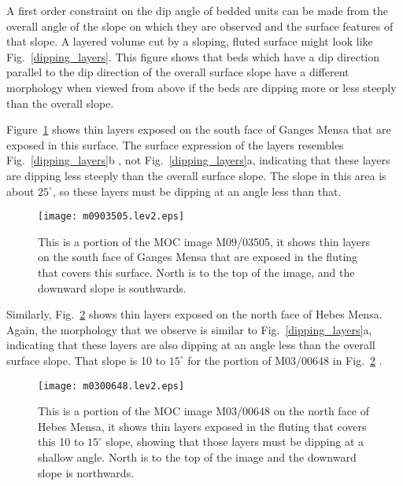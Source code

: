 \documentclass{lpscabs}
\begin{document}
\begin{abstracttext}
A first order constraint on the dip angle of bedded units can be
made from the overall angle of the slope on which they are observed
and the surface features of that slope.
A layered volume cut by a sloping, fluted surface might look like
Fig.~\ref{dipping_layers}.  This figure
shows that beds which have a dip direction parallel to the dip
direction of the overall surface slope have a different morphology
when viewed from above if the beds are dipping more or less steeply
than the overall slope.  

Figure~\ref{M09/03505} shows thin layers exposed on the south face
of Ganges Mensa that are exposed in this surface.  The surface
expression of the layers resembles Fig.~\ref{dipping_layers}b , not
Fig.~\ref{dipping_layers}a, indicating that these layers are dipping
less steeply than the overall surface slope.  The slope in this
area is about $25^{\circ}$, so these layers must be dipping at an
angle less than that.
\begin{figure}[!h]
\noindent\texttt{[image: m0903505.lev2.eps]}
\caption{
        \label{M09/03505}
		This is a portion of the MOC image M09/03505, it shows thin layers 
		on the south face of Ganges Mensa that are exposed in the fluting
		that covers this surface.  North is to the top of the image,
		and the downward slope is southwards.
        }
\end{figure}

Similarly, Fig.~\ref{M03/00648} shows thin
layers exposed on the north face of Hebes Mensa.  Again, the
morphology that we observe is similar to Fig.~\ref{dipping_layers}a, 
indicating that these layers are also dipping at an angle
less than the overall surface slope.  That slope is 10 to $15^{\circ}$
for the portion of M03/00648 in Fig.~\ref{M03/00648} . 
\begin{figure}[!h]
\noindent\texttt{[image: m0300648.lev2.eps]}
\caption{
        \label{M03/00648}
		This is a portion of the MOC image M03/00648 on the north
		face of Hebes Mensa, it shows thin layers exposed in the fluting
		that covers this 10 to $15^{\circ}$ slope, showing
		that those layers must be dipping at a shallow angle.  North
		is to the top of the image and the downward slope is
		northwards.
        }
\end{figure}


\end{abstracttext}
\end{document}
